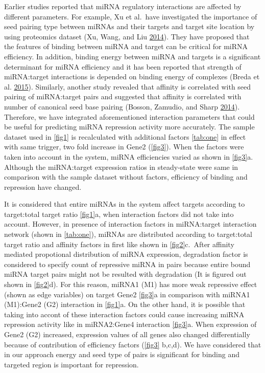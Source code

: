 \documentclass[]{article}
\begin{document}
Earlier studies reported that miRNA regulatory interactions are affected
by different parameters. For example, Xu et al.~have investigated the
importance of seed pairing type between miRNAs and their targets and
target site location by using proteomics dataset (Xu, Wang, and Liu
\protect\hyperlink{ref-xu_characterization_2014}{2014}). They have
proposed that the features of binding between miRNA and target can be
critical for miRNA efficiency. In addition, binding energy between miRNA
and targets is a significant determinant for miRNA efficiency and it has
been reported that strength of miRNA:target interactions is depended on
binding energy of complexes (Breda et al.
\protect\hyperlink{ref-breda_quantifying_2015}{2015}). Similarly,
another study revealed that affinity is correlated with seed pairing of
miRNA:target pairs and suggested that affinity is correlated with number
of canonical seed base pairing (Bosson, Zamudio, and Sharp
\protect\hyperlink{ref-bosson_endogenous_2014}{2014}). Therefore, we
have integrated aforementioned interaction parameters that could be
useful for predicting miRNA repression activity more accurately. The
sample dataset used in \autoref{fig1} is recalculated with additional
factors \autoref{tab:one} in effect with same trigger, two fold increase
in Gene2 (\autoref{fig3}). When the factors were taken into account in
the system, miRNA efficiencies varied as shown in \autoref{fig3}a.
Although the miRNA:target expression ratios in steady-state were same in
comparison with the sample dataset without factors, efficiency of
binding and repression have changed.

It is considered that entire miRNAs in the system affect targets
according to target:total target ratio \autoref{fig1}a, when interaction
factors did not take into account. However, in presence of interaction
factors in miRNA:target interaction network (shown in
\autoref{tab:one}), miRNAs are distributed according to target:total
target ratio and affinity factors in first like shown in
\autoref{fig2}c.~After affinity mediated propotional distribution of
miRNA expression, degradation factor is considered to specify count of
repressive miRNA in pairs because entire bound miRNA target pairs might
not be resulted with degradation (It is figured out shown in
\autoref{fig2}d). For this reason, miRNA1 (M1) has more weak repressive
effect (shown as edge variables) on target Gene2 \autoref{fig3}a in
comparison with miRNA1 (M1):Gene2 (G2) interaction in \autoref{fig1}a.
On the other hand, it is possible that taking into accont of these
interaction factors could cause increasing miRNA repression activity
like in miRNA2:Gene4 interaction \autoref{fig3}a. When expression of
Gene2 (G2) increased, expression values of all genes also changed
differentially because of contribution of efficiency factors
(\autoref{fig3} b,c,d). We have considered that in our approach energy
and seed type of pairs is significant for binding and targeted region is
important for repression.
\end{document}
